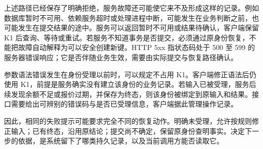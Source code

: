 上述路径已经保存了明确拒绝，服务故障还可能使它来不及形成这样的记录。例如数据库暂时不可用、依赖服务超时或处理进程中断，可能发生在业务判断之前，也可能发生在提交结果的途中。服务可以返回暂时不可用或结果待确认，客户端保留 K1 后查询、等待或重试。若服务不知道事务是否提交，必须通过原身份恢复，不能把故障自动解释为可以安全创建新键。HTTP 5xx 指状态码处于 500 至 599 的服务器错误响应；它是否伴随业务生效，需要由实际提交与恢复路径确认。



参数语法错误发生在身份受理以前时，可以规定不占用 K1。客户端修正语法后仍使用 K1，前提是服务确实没有建立该身份的业务记录。若输入已被受理，服务后续发现余额不足或报价过期，并保存为终态，则该身份被绑定到原输入和结果。接口需要给出可辨别的错误码与是否已受理信息，客户端据此管理操作记录。

因此，相同的失败提示可能要求完全不同的恢复动作。明确未受理，允许按规则修正输入；已有终态，沿用原结论；提交尚不确定，保留原身份查明事实。决定下一步的依据，是系统留下了哪类持久记录，以及当前调用方能否读取它。
\FloatBarrier
